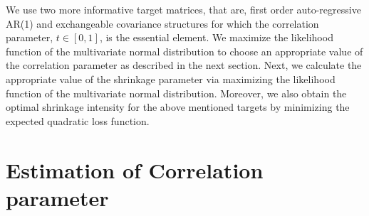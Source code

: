 We use two more informative target matrices, that are, first order auto-regressive AR(1) and exchangeable covariance structures for which the correlation parameter, $t \in [0,1]$, is the essential element. We maximize the likelihood function of the multivariate normal distribution to choose an appropriate value of the correlation parameter as described in the next section. Next, we calculate the appropriate value of the shrinkage parameter via maximizing the likelihood function of the multivariate normal distribution. Moreover, we also obtain the optimal shrinkage intensity for the above mentioned targets by minimizing the expected quadratic loss function.    


\section{Estimation of Correlation parameter}

